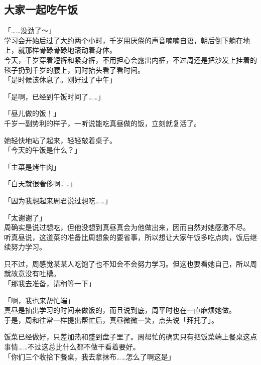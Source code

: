 \subsection{大家一起吃午饭}

「……没劲了～」\\

学习会开始后过了大约两个小时，千岁用厌倦的声音喃喃自语，朝后倒下躺在地上，就那样骨碌骨碌地滚动着身体。\\

今天，千岁穿着短裤和紧身裤，不用担心会露出内裤，不过周还是把沙发上挂着的毯子扔到千岁的腰上，同时抬头看了看时间。\\

「是时候该休息了。刚好过了中午」

「是啊，已经到午饭时间了……」

「昼儿做的饭！」\\

千岁一副势利的样子，一听说能吃真昼做的饭，立刻就复活了。

她轻快地站了起来，轻轻敲着桌子。\\

「今天的午饭是什么？」

「主菜是烤牛肉」

「白天就很奢侈啊……」

「因为我想起来周君说过想吃……」

「太谢谢了」\\

周确实是说过想吃，但他没想到真昼真会为他做出来，因而自然对她感激不尽。\\

听真昼说，这道菜的准备比周想象的要省事，所以想让大家午饭多吃点肉，饭后继续努力学习。

只不过，周感觉某某人吃饱了也不知会不会努力学习。但这也要看她自己，所以周就故意没有吐槽。\\

「那我去准备，请稍等一下」

「啊，我也来帮忙端」\\

真昼是抽出学习的时间来做饭的，而且说到底，周平时也在一直麻烦她做。\\

于是，周和往常一样提出帮忙后，真昼微微一笑，点头说「拜托了」。

饭菜已经做好，只差加热和盛到盘子里了。周帮忙的确实只有把饭菜端上餐桌这点事情……不过这总比什么都不做干看着要好。\\

「你们三个收拾下餐桌，我去拿抹布……怎么了啊这是」

